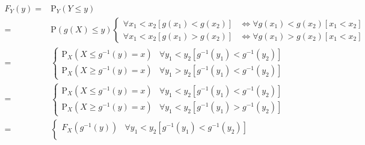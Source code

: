 \documentclass[
]{book}
\theoremstyle{definition}
\theoremstyle{definition}
\theoremstyle{definition}
\theoremstyle{definition}
\theoremstyle{remark}
\begin{document}
\[
\begin{aligned}
F_{{\scriptscriptstyle Y}}\left(y\right)= & \mathrm{P}_{{\scriptscriptstyle Y}}\left(Y\le y\right)\\
= & \mathrm{P}\left(g\left(X\right)\le y\right)\begin{cases}
\forall x_{{\scriptscriptstyle 1}}<x_{{\scriptscriptstyle 2}}\left[g\left(x_{{\scriptscriptstyle 1}}\right)<g\left(x_{{\scriptscriptstyle 2}}\right)\right] & \Leftrightarrow\forall g\left(x_{{\scriptscriptstyle 1}}\right)<g\left(x_{{\scriptscriptstyle 2}}\right)\left[x_{{\scriptscriptstyle 1}}<x_{{\scriptscriptstyle 2}}\right]\\
\forall x_{{\scriptscriptstyle 1}}<x_{{\scriptscriptstyle 2}}\left[g\left(x_{{\scriptscriptstyle 1}}\right)>g\left(x_{{\scriptscriptstyle 2}}\right)\right] & \Leftrightarrow\forall g\left(x_{{\scriptscriptstyle 1}}\right)>g\left(x_{{\scriptscriptstyle 2}}\right)\left[x_{{\scriptscriptstyle 1}}<x_{{\scriptscriptstyle 2}}\right]
\end{cases}\\
= & \begin{cases}
\mathrm{P}_{{\scriptscriptstyle X}}\left(X\le g^{-1}\left(y\right)=x\right) & \forall y_{{\scriptscriptstyle 1}}<y_{{\scriptscriptstyle 2}}\left[g^{-1}\left(y_{{\scriptscriptstyle 1}}\right)<g^{-1}\left(y_{{\scriptscriptstyle 2}}\right)\right]\\
\mathrm{P}_{{\scriptscriptstyle X}}\left(X\ge g^{-1}\left(y\right)=x\right) & \forall y_{{\scriptscriptstyle 1}}>y_{{\scriptscriptstyle 2}}\left[g^{-1}\left(y_{{\scriptscriptstyle 1}}\right)<g^{-1}\left(y_{{\scriptscriptstyle 2}}\right)\right]
\end{cases}\\
= & \begin{cases}
\mathrm{P}_{{\scriptscriptstyle X}}\left(X\le g^{-1}\left(y\right)=x\right) & \forall y_{{\scriptscriptstyle 1}}<y_{{\scriptscriptstyle 2}}\left[g^{-1}\left(y_{{\scriptscriptstyle 1}}\right)<g^{-1}\left(y_{{\scriptscriptstyle 2}}\right)\right]\\
\mathrm{P}_{{\scriptscriptstyle X}}\left(X\ge g^{-1}\left(y\right)=x\right) & \forall y_{{\scriptscriptstyle 1}}<y_{{\scriptscriptstyle 2}}\left[g^{-1}\left(y_{{\scriptscriptstyle 1}}\right)>g^{-1}\left(y_{{\scriptscriptstyle 2}}\right)\right]
\end{cases}\\
= & \begin{cases}
F_{{\scriptscriptstyle X}}\left(g^{-1}\left(y\right)\right) & \forall y_{{\scriptscriptstyle 1}}<y_{{\scriptscriptstyle 2}}\left[g^{-1}\left(y_{{\scriptscriptstyle 1}}\right)<g^{-1}\left(y_{{\scriptscriptstyle 2}}\right)\right]\\

\end{cases}
\end{aligned}\]
\end{document}
